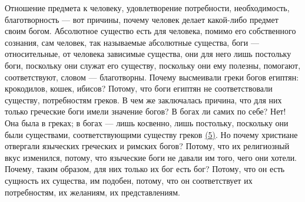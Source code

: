 \documentclass[12pt]{article}
\begin{document}
Отношение предмета к человеку, удовлетворение потребности, необходимость, благотворность --- вот причины, почему человек делает какой-либо предмет своим богом. Абсолютное существо есть для человека, помимо его собственного сознания, сам человек, так называемые абсолютные существа, боги --- относительные, от человека зависимые существа, они для него лишь постольку боги, поскольку они служат его существу, поскольку они ему полезны, помогают, соответствуют, словом --- благотворны. Почему высмеивали греки богов египтян: крокодилов, кошек, ибисов? Потому, что боги египтян не соответствовали существу, потребностям греков. В чем же заключалась причина, что для них только греческие боги имели значение богов? В богах ли самих по себе? Нет! Она была в греках; в богах --- лишь косвенно, лишь постольку, поскольку они были существами, соответствующими существу греков \hyperlink{5}{(5)}\hypertarget{b5}{}. Но почему христиане отвергали языческих греческих и римских богов? Потому, что их религиозный вкус изменился, потому, что языческие боги не давали им того, чего они хотели. Почему, таким образом, для них только их бог есть бог? Потому, что он есть сущность их существа, им подобен, потому, что он соответствует их потребностям, их желаниям, их представлениям. 
\end{document}
